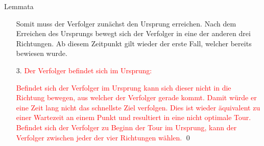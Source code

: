 \documentclass[10pt,table,xcolor=dvipsnames]{beamer}
\begin{document}
\begin{frame}{Lemmata}
\begin{itemize}
Somit muss der Verfolger zunächst den Ursprung erreichen. Nach dem Erreichen des Ursprungs bewegt  sich der Verfolger in eine der anderen drei Richtungen. Ab diesem Zeitpunkt gilt wieder der erste Fall, welcher bereits bewiesen wurde.

\item[3.]
\textcolor{red}{Der Verfolger befindet sich im Ursprung:}

\textcolor{red}{Befindet sich der Verfolger im Ursprung kann sich dieser nicht in die Richtung bewegen, aus welcher der Verfolger gerade kommt. Damit würde er eine Zeit lang nicht das schnellste Ziel verfolgen. Dies ist wieder äquivalent zu einer Wartezeit an einem Punkt und resultiert in eine nicht optimale Tour. Befindet sich der Verfolger zu Beginn der Tour im Ursprung, kann der Verfolger zwischen jeder der vier Richtungen wählen.} \qed
\end{itemize}
\end{frame}
\end{document}
